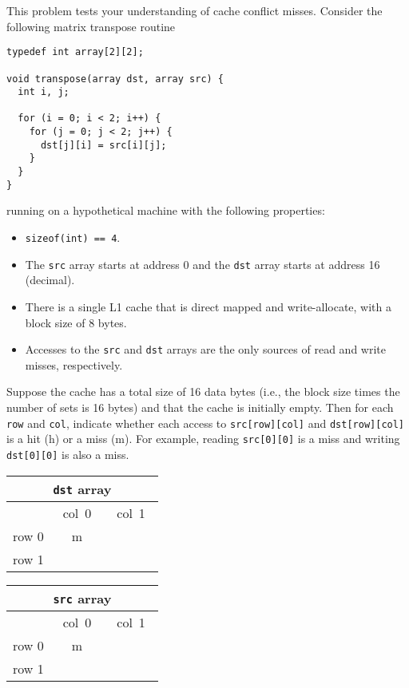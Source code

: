 \newpage
\begin{problem}{12}
This problem tests your understanding of cache conflict misses.
Consider the following matrix transpose routine

{\small\begin{verbatim}
typedef int array[2][2];

void transpose(array dst, array src) {
  int i, j;

  for (i = 0; i < 2; i++) {
    for (j = 0; j < 2; j++) {
      dst[j][i] = src[i][j];
    }
  }
}
\end{verbatim}}
running on a hypothetical machine with the following properties:
\begin{itemize}
\item {\tt sizeof(int) == 4}.
\item The {\tt src} array starts at address 0 and the {\tt dst} 
array starts at address 16 (decimal).
\item There is a single L1 cache that is direct mapped and write-allocate, 
with  a block size of 8 bytes.
\item Accesses to the {\tt src} and {\tt dst} arrays are the only
sources of read and write misses, respectively.
\end{itemize}

\begin{choice}
\item Suppose the cache has a total size of 16 data bytes (i.e.,
the block size times the number of sets is 16 bytes) and that the
cache is initially empty. Then for each {\tt row} and {\tt col},
indicate whether each access to {\tt src[row][col]} and {\tt dst[row][col]} is
a hit (h) or a miss (m).  For example, reading {\tt src[0][0]} is a
miss and writing {\tt dst[0][0]} is also a miss.

\begin{minipage}[t]{2in}
\renewcommand{\arraystretch}{1.8}
\begin{tabular}{|c||c|c|}
\hline
\multicolumn{3}{|c|}{{\tt dst} array}\\
\hline
&\mbox{\ col 0\ }&\mbox{\ col 1\ }\\
\hline
\hline
row 0&m&\\
\hline
row 1&&\\
\hline 
\end{tabular}
\end{minipage}
\begin{minipage}[t]{2in}
\renewcommand{\arraystretch}{1.8}
\begin{tabular}{|c||c|c|}
\hline
\multicolumn{3}{|c|}{{\tt src} array}\\
\hline
&\mbox{\ col 0\ }&\mbox{\ col 1\ }\\
\hline
\hline
row 0&m&\\
\hline
row 1&&\\
\hline
\end{tabular}
\end{minipage}
\end{choice}
\end{problem}
